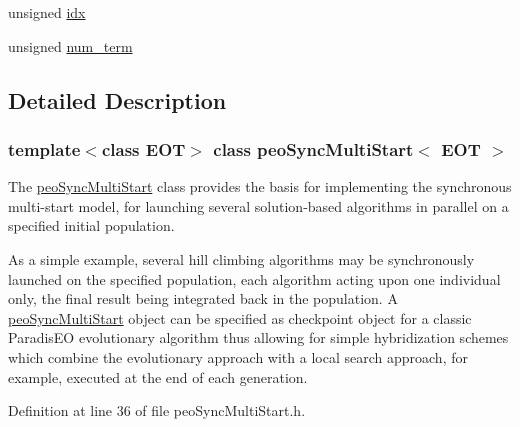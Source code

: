 \begin{CompactItemize}
\item 
\hypertarget{classpeoSyncMultiStart_64191ef79b7b589964ac9c3e23ae6718}{
unsigned \hyperlink{classpeoSyncMultiStart_64191ef79b7b589964ac9c3e23ae6718}{idx}}
\label{classpeoSyncMultiStart_64191ef79b7b589964ac9c3e23ae6718}

\item 
\hypertarget{classpeoSyncMultiStart_773eb9097550d9444f25ca8f48997a30}{
unsigned \hyperlink{classpeoSyncMultiStart_773eb9097550d9444f25ca8f48997a30}{num\_\-term}}
\label{classpeoSyncMultiStart_773eb9097550d9444f25ca8f48997a30}

\end{CompactItemize}


\subsection{Detailed Description}
\subsubsection*{template$<$class EOT$>$ class peo\-Sync\-Multi\-Start$<$ EOT $>$}

The \hyperlink{classpeoSyncMultiStart}{peo\-Sync\-Multi\-Start} class provides the basis for implementing the synchronous multi-start model, for launching several solution-based algorithms in parallel on a specified initial population. 

As a simple example, several hill climbing algorithms may be synchronously launched on the specified population, each algorithm acting upon one individual only, the final result being integrated back in the population. A \hyperlink{classpeoSyncMultiStart}{peo\-Sync\-Multi\-Start} object can be specified as checkpoint object for a classic Paradis\-EO evolutionary algorithm thus allowing for simple hybridization schemes which combine the evolutionary approach with a local search approach, for example, executed at the end of each generation. 



Definition at line 36 of file peo\-Sync\-Multi\-Start.h.

